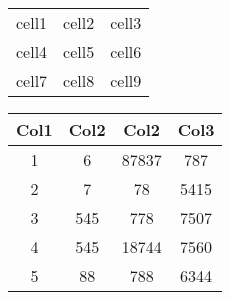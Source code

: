 \documentclass{article}
\begin{document}
    \begin{center}
        \begin{tabular}{ |c|c|c| } 
            \hline
            cell1 & cell2 & cell3 \\ 
            cell4 & cell5 & cell6 \\ 
            cell7 & cell8 & cell9 \\ 
            \hline
        \end{tabular}
    \end{center}

    \begin{center}
        \begin{tabular}{||c c c c||} 
            \hline
            Col1 & Col2 & Col2 & Col3 \\ [0.5ex] 
            \hline\hline
            1 & 6 & 87837 & 787 \\ 
            \hline
            2 & 7 & 78 & 5415 \\
            \hline
            3 & 545 & 778 & 7507 \\
            \hline
            4 & 545 & 18744 & 7560 \\
            \hline
            5 & 88 & 788 & 6344 \\ [1ex] 
            \hline
       \end{tabular}
    \end{center}
\end{document}
